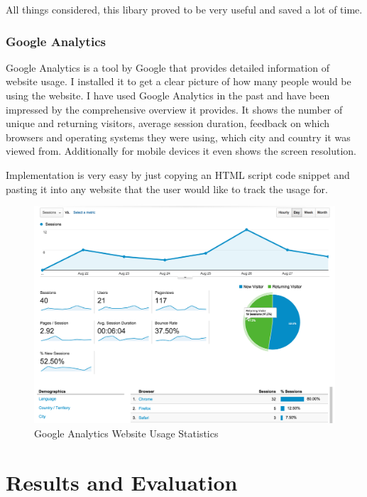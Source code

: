 \documentclass[a4paper,11pt,twoside]{article}
\begin{document}
All things considered, this libary proved to be very useful and saved a lot of time.




\subsubsection{Google Analytics}

Google Analytics is a tool by Google that provides detailed information of website usage. I installed it to get a clear picture of how many people would be using the website. I have used Google Analytics in the past and have been impressed by the comprehensive overview it provides. It shows the number of unique and returning visitors, average session duration, feedback on which browsers and operating systems they were using, which city and country it was viewed from. Additionally for mobile devices it even shows the screen resolution.

Implementation is very easy by just copying an HTML script code snippet and pasting it into any website that the user would like to track the usage for.

\begin{figure}[ht!]
\centering
\includegraphics[width=160mm]{graphics/googleAnalytics_01.png}
\caption{Google Analytics Website Usage Statistics}
\label{fig:UIdesign1}
\end{figure}








\newpage


\section{Results and Evaluation}
\end{document}
